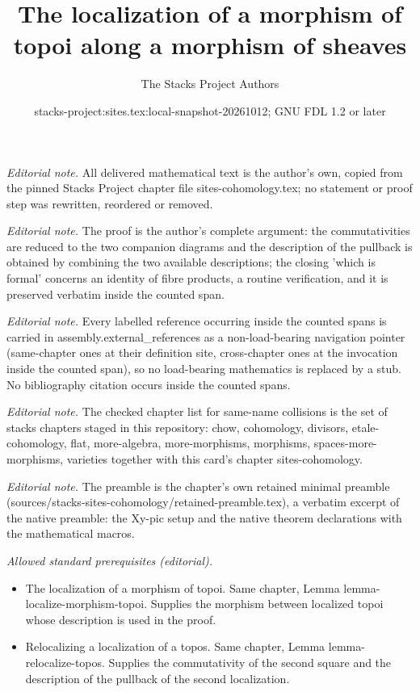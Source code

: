 \documentclass[10pt,a4paper]{amsart}
\title{The localization of a morphism of topoi along a morphism of sheaves}
\author{The Stacks Project Authors}
\date{stacks-project:sites.tex:local-snapshot-20261012; GNU FDL 1.2 or later}
\theoremstyle{plain}
\theoremstyle{definition}
\theoremstyle{remark}
\numberwithin{equation}{subsection}
\begin{document}
\maketitle
\noindent\textit{Editorial note.} All delivered mathematical text is the author's own, copied from the pinned Stacks Project chapter file sites-cohomology.tex; no statement or proof step was rewritten, reordered or removed.\par\medskip
\noindent\textit{Editorial note.} The proof is the author's complete argument: the commutativities are reduced to the two companion diagrams and the description of the pullback is obtained by combining the two available descriptions; the closing 'which is formal' concerns an identity of fibre products, a routine verification, and it is preserved verbatim inside the counted span.\par\medskip
\noindent\textit{Editorial note.} Every labelled reference occurring inside the counted spans is carried in assembly.external\_references as a non-load-bearing navigation pointer (same-chapter ones at their definition site, cross-chapter ones at the invocation inside the counted span), so no load-bearing mathematics is replaced by a stub. No bibliography citation occurs inside the counted spans.\par\medskip
\noindent\textit{Editorial note.} The checked chapter list for same-name collisions is the set of stacks chapters staged in this repository: chow, cohomology, divisors, etale-cohomology, flat, more-algebra, more-morphisms, morphisms, spaces-more-morphisms, varieties together with this card's chapter sites-cohomology.\par\medskip
\noindent\textit{Editorial note.} The preamble is the chapter's own retained minimal preamble (sources/stacks-sites-cohomology/retained-preamble.tex), a verbatim excerpt of the native preamble: the Xy-pic setup and the native theorem declarations with the mathematical macros.\par\medskip
\noindent\textit{Allowed standard prerequisites (editorial).}\begin{itemize}
\item The localization of a morphism of topoi. Same chapter, Lemma lemma-localize-morphism-topoi. Supplies the morphism between localized topoi whose description is used in the proof.
\item Relocalizing a localization of a topos. Same chapter, Lemma lemma-relocalize-topos. Supplies the commutativity of the second square and the description of the pullback of the second localization.
\end{itemize}\medskip
\end{document}

